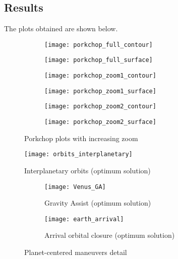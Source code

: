 

\clearpage

\subsection{Results}
The plots obtained are shown below.

\begin{figure}[htp]
	\begin{subfigure}{.5\textwidth}
		\centering
		\texttt{[image: porkchop\_full\_contour]}
	\end{subfigure}
	\begin{subfigure}{.5\textwidth}
		\centering
		\texttt{[image: porkchop\_full\_surface]}
	\end{subfigure}


	\begin{subfigure}{.5\textwidth}
		\centering
		\texttt{[image: porkchop\_zoom1\_contour]}
	\end{subfigure}
	\begin{subfigure}{.5\textwidth}
		\centering
		\texttt{[image: porkchop\_zoom1\_surface]}
	\end{subfigure}


	\begin{subfigure}{.5\textwidth}
		\centering
		\texttt{[image: porkchop\_zoom2\_contour]}
	\end{subfigure}
	\begin{subfigure}{.5\textwidth}
		\centering
		\texttt{[image: porkchop\_zoom2\_surface]}
	\end{subfigure}
	\caption{Porkchop plots with increasing zoom}
\end{figure}

\begin{figure}[htp]
\centering
\texttt{[image: orbits\_interplanetary]}
\caption{Interplanetary orbits (optimum solution)}
\end{figure}
\begin{figure}[htp]
\begin{subfigure}{.5\textwidth}
\centering
\texttt{[image: Venus\_GA]}
\caption{Gravity Assist (optimum solution)}
\end{subfigure}
\begin{subfigure}{.5\textwidth}
\centering
\texttt{[image: earth\_arrival]}
\caption{Arrival orbital closure (optimum solution)}
\end{subfigure}
\caption{Planet-centered maneuvers detail}
\end{figure}

